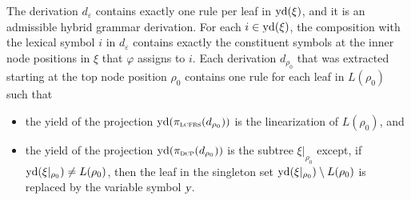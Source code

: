 \documentclass[../../document.tex]{subfiles}
\begin{document}
    The derivation \(d_\varepsilon\) contains exactly one rule per leaf in \(\operatorname{yd}(\xi)\), and it is an admissible hybrid grammar derivation.
    For each \(i \in \operatorname{yd}(\xi)\), the  composition with the lexical symbol \(i\) in \(d_\varepsilon\) contains exactly the constituent symbols at the inner node positions in \(\xi\) that \(\varphi\) assigns to \(i\).
    Each derivation \(d_{\rho_0}\) that was extracted starting at the top node position \(\rho_0\) contains one rule for each leaf in \(L(\rho_0)\) such that
    \begin{itemize}
        \item the yield of the  projection \(\operatorname{yd}(\pi_{\textsc{lcfrs}}(d_{\rho_0}))\) is the linearization of \(L(\rho_0)\), and
        \item the yield of the  projection \(\operatorname{yd}(\pi_{\textsc{dcp}}(d_{\rho_0}))\) is the subtree \(\xi|_{\rho_0}\) except, if \(\operatorname{yd}(\xi|_{\rho_0}) \neq L(\rho_0)\), then the leaf in the singleton set \(\operatorname{yd}(\xi|_{\rho_0}) \setminus L(\rho_0)\) is replaced by the variable symbol \(\textsl{y}\).
    \end{itemize}
\end{document}
